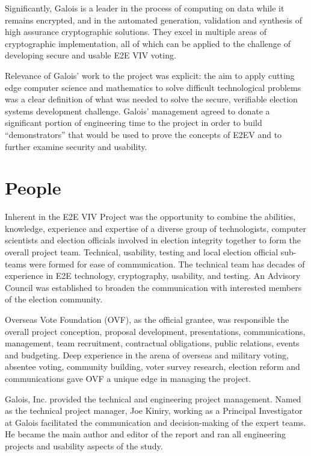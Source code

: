 Significantly, Galois is a leader in the process of computing on data
while it remains encrypted, and in the automated generation,
validation and synthesis of high assurance cryptographic
solutions. They excel in multiple areas of cryptographic
implementation, all of which can be applied to the challenge of
developing secure and usable E2E VIV voting.

Relevance of Galois’ work to the project was explicit: the aim to
apply cutting edge computer science and mathematics to solve difficult
technological problems was a clear definition of what was needed to
solve the secure, verifiable election systems development
challenge. Galois’ management agreed to donate a significant portion
of engineering time to the project in order to build “demonstrators”
that would be used to prove the concepts of E2EV and to further
examine security and usability.

\section{People}
\label{sec:people}

Inherent in the E2E VIV Project was the opportunity to combine the
abilities, knowledge, experience and expertise of a diverse group of
technologists, computer scientists and election officials involved in
election integrity together to form the overall project
team. Technical, usability, testing and local election official
sub-teams were formed for ease of communication. The technical team
has decades of experience in E2E technology, cryptography, usability,
and testing. An Advisory Council was established to broaden the
communication with interested members of the election community. 

Overseas Vote Foundation (OVF), as the official grantee, was
responsible the overall project conception, proposal development,
presentations, communications, management, team recruitment,
contractual obligations, public relations, events and budgeting. Deep
experience in the arena of overseas and military voting, absentee
voting, community building, voter survey research, election reform and
communications gave OVF a unique edge in managing the project. 

Galois, Inc. provided the technical and engineering project
management. Named as the technical project manager, Joe Kiniry,
working as a Principal Investigator at Galois facilitated the
communication and decision-making of the expert teams. He became the
main author and editor of the report and ran all engineering projects
and usability aspects of the study. 


